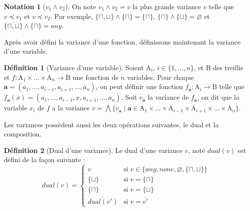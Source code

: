 \documentclass{rapport}
\theoremstyle{plain}
\theoremstyle{remark}
\theoremstyle{definition}
\newtheorem{notat}{Notation}
\newtheorem{dfn}{Définition}
\begin{document}
\begin{notat} [$v_1 \wedge v_2$] On note $v_1 \wedge v_2 = v$ la plus grande variance $v$ telle que $v \preccurlyeq v_1$ et $v \preccurlyeq v_2$. Par exemple, $\{\sqcap, \sqcup\} \wedge \{\sqcap\} = \{\sqcap\}$, $\{\sqcap\} \wedge \{\sqcup\} = \varnothing$ et $\overline{\{\sqcap, \sqcup\}} \wedge \{\sqcap\} = any$.
\end{notat}

Après avoir défini la variance d'une fonction, définissons maintenant la variance d'une variable. 

\begin{dfn} [Variance d'une variable] Soient A$_i$, $i \in \{1, \ldots, n\}$, et B des treillis et ${f : \text{A}_1 \times \ldots \times \text{A}_n \rightarrow \text{B}}$ une fonction de $n$ variables. Pour chaque ${\textbf{a} = (a_1, \ldots, a_{i-1}, a_{i+1}, \ldots, a_n)}$, on peut définir une fonction $f_{\textbf{a}} : \text{A}_i \rightarrow \text{B}$ telle que ${f_{\textbf{a}}(x) = (a_1, \ldots, a_{i-1}, x, a_{i+1}, \ldots, a_n)}$. Soit $v_{\textbf{a}}$ la variance de $f_{\textbf{a}}$, on dit que la variable $x_i$ de $f$ a la variance ${v = \bigwedge \{v_{\textbf{a}} \mid \textbf{a} \in \text{A}_1 \times \ldots \times \text{A}_{i-1} \times \text{A}_{i+1} \times \ldots \times \text{A}_n\}}$.
\end{dfn}

Les variances possèdent aussi les deux opérations suivantes, le dual et la composition.  

\begin{dfn} [Dual d'une variance] Le dual d'une variance $v$, noté $dual(v)$ est défini de la façon suivante : 
\[dual(v) = \left\{
\begin{array}{ll}
v & \text{si }v \in \{any, none, \varnothing, \{\sqcap, \sqcup\}\}\\
\{\sqcup\} & \text{si }v = \{\sqcap\}\\
\{\sqcap\} & \text{si }v = \{\sqcup\}\\
\overline{dual(v')} & \text{si }v = \overline{v'}
\end{array}\right.\]
\end{dfn}
\end{document}
